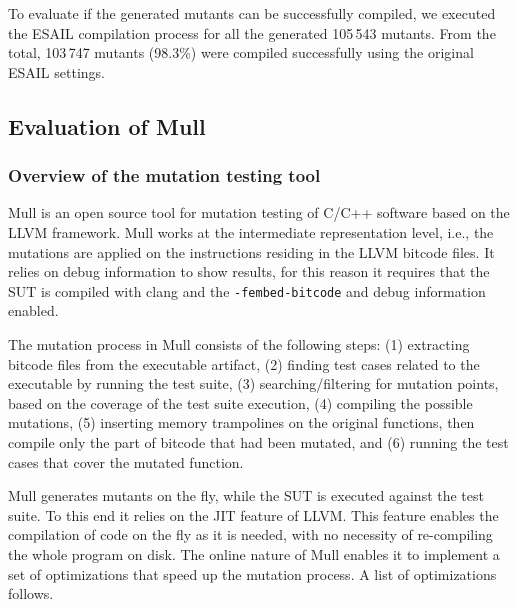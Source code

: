










To evaluate if the generated mutants can be successfully compiled, we executed the ESAIL compilation process for all the generated 105\,543 mutants. From the total, 103\,747 mutants (98.3\%) were compiled successfully using the original ESAIL settings.

\subsection{Evaluation of Mull}
\label{subsec:mull}

\subsubsection{Overview of the mutation testing tool}

Mull is an open source tool for mutation testing of C/C++ software based on the LLVM framework. Mull works at the intermediate representation level, i.e., the mutations are applied on the instructions residing in the LLVM bitcode files. It relies on debug information to show results, for this reason it requires that the SUT is compiled with clang and the \texttt{-fembed-bitcode} and debug information enabled. 

The mutation process in Mull consists of the following steps: (1) extracting bitcode files from the executable artifact, (2) finding test cases related to the executable by running the test suite, (3) searching/filtering for mutation points, based on the coverage of the test suite execution, (4) compiling the possible mutations, (5) inserting memory trampolines on the original functions, then compile only the part of bitcode that had been mutated, and (6) running the test cases that cover the mutated function.

Mull generates mutants on the fly, while the SUT is executed against the test suite. To this end it relies on the JIT feature of LLVM. This feature enables the compilation of code on the fly as it is needed, with no necessity of re-compiling the whole program on disk. The online nature of Mull enables it to implement a set of optimizations that speed up the mutation process. A list of optimizations follows.

